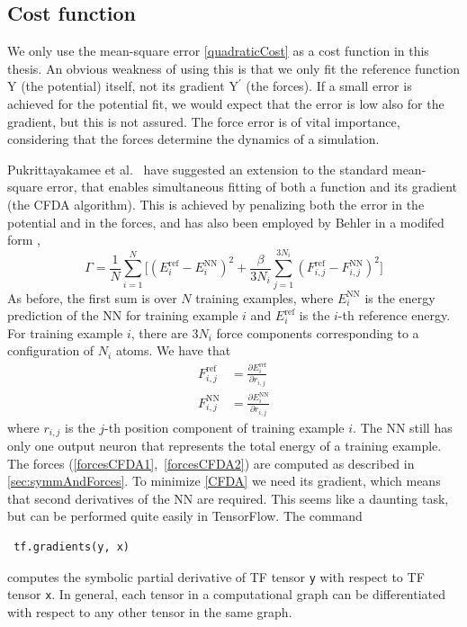 \documentclass[twoside,english]{uiofysmaster}
\begin{document}
\subsection{Cost function} \label{sec:hyperParamsCostFunction}
We only use the mean-square error \eqref{quadraticCost} as a cost function in this thesis. 
An obvious weakness of using this is that we only fit the reference function Y (the potential) itself, 
not its gradient $\mathrm{Y}^\prime$ (the forces). If a small error is achieved for the potential fit, we would expect that 
the error is low also for the gradient, but this is not assured. The force error is of vital importance, considering 
that the forces determine the dynamics of a simulation. 

Pukrittayakamee et al.\ \cite{Pukrittayakamee09} have suggested an extension to the standard mean-square error, that 
enables simultaneous fitting of both a function and its gradient (the CFDA algorithm). 
This is achieved by penalizing both the error 
in the potential and in the forces, and has also been employed by Behler in a modifed form \cite{Behler15},
\begin{equation}
 \Gamma = \frac{1}{N}\sum_{i=1}^N \biggr[(E_i^{\mathrm{ref}} - E_i^{\mathrm{NN}})^2 + 
 \frac{\beta}{3N_i}\sum_{j=1}^{3N_i} (F_{i,j}^{\mathrm{ref}} - F_{i,j}^{\mathrm{NN}})^2 \biggr]
 \label{CFDA}
\end{equation}
As before, the first sum is over $N$ training examples, where $E_i^{\mathrm{NN}}$
is the energy prediction of the NN for training example $i$ and $E_i^{\mathrm{ref}}$ is the $i$-th reference energy. 
For training example $i$, there are $3N_i$ force components corresponding to a configuration of $N_i$ atoms. We have that
\begin{subequations}
\begin{align}
 F_{i,j}^{\mathrm{ref}} &= \frac{\partial E_i^{\mathrm{ref}}}{\partial r_{i,j}} \label{forcesCFDA1} \\
 F_{i,j}^{\mathrm{NN}} &= \frac{\partial E_i^{\mathrm{NN}}}{\partial r_{i,j}}
 \label{forcesCFDA2}
\end{align}
\end{subequations}
where $r_{i,j}$ is the $j$-th position component of training example $i$. The NN still has only one output neuron
that represents the total energy of a training example. The forces (\ref{forcesCFDA1},~\ref{forcesCFDA2}) are computed as
described in \autoref{sec:symmAndForces}.
To minimize \eqref{CFDA} we need its gradient, which means that second derivatives of the NN 
are required. This seems like a daunting task, but can be performed quite easily in TensorFlow. 
The command
\begin{verbatim}
 tf.gradients(y, x)
\end{verbatim}
computes the symbolic partial derivative of TF tensor \texttt{y} with respect to TF tensor \texttt{x}. In general, each tensor 
in a computational graph can be differentiated with respect to any other tensor in the same graph. 
\end{document}
